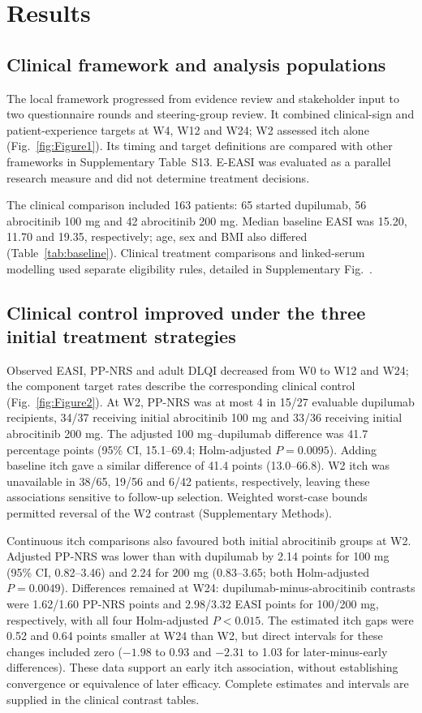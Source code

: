 \section{Results}
\subsection{Clinical framework and analysis populations}
The local framework progressed from evidence review and stakeholder input to two questionnaire rounds and steering-group review. It combined clinical-sign and patient-experience targets at W4, W12 and W24; W2 assessed itch alone (Fig.~\ref{fig:Figure1}). Its timing and target definitions are compared with other frameworks in Supplementary Table~S13. E-EASI was evaluated as a parallel research measure and did not determine treatment decisions.


The clinical comparison included 163 patients: 65 started dupilumab, 56 abrocitinib 100 mg and 42 abrocitinib 200 mg. Median baseline EASI was 15.20, 11.70 and 19.35, respectively; age, sex and BMI also differed (Table~\ref{tab:baseline}). Clinical treatment comparisons and linked-serum modelling used separate eligibility rules, detailed in Supplementary Fig.~.


\subsection{Clinical control improved under the three initial treatment strategies}
Observed EASI, PP-NRS and adult DLQI decreased from W0 to W12 and W24; the component target rates describe the corresponding clinical control (Fig.~\ref{fig:Figure2}). At W2, PP-NRS was at most 4 in 15/27 evaluable dupilumab recipients, 34/37 receiving initial abrocitinib 100 mg and 33/36 receiving initial abrocitinib 200 mg. The adjusted 100 mg--dupilumab difference was 41.7 percentage points (95\% CI, 15.1--69.4; Holm-adjusted $P=0.0095$). Adding baseline itch gave a similar difference of 41.4 points (13.0--66.8). W2 itch was unavailable in 38/65, 19/56 and 6/42 patients, respectively, leaving these associations sensitive to follow-up selection. Weighted worst-case bounds permitted reversal of the W2 contrast (Supplementary Methods).

Continuous itch comparisons also favoured both initial abrocitinib groups at W2. Adjusted PP-NRS was lower than with dupilumab by 2.14 points for 100 mg (95\% CI, 0.82--3.46) and 2.24 for 200 mg (0.83--3.65; both Holm-adjusted $P=0.0049$). Differences remained at W24: dupilumab-minus-abrocitinib contrasts were 1.62/1.60 PP-NRS points and 2.98/3.32 EASI points for 100/200 mg, respectively, with all four Holm-adjusted $P<0.015$. The estimated itch gaps were 0.52 and 0.64 points smaller at W24 than W2, but direct intervals for these changes included zero ($-1.98$ to 0.93 and $-2.31$ to 1.03 for later-minus-early differences). These data support an early itch association, without establishing convergence or equivalence of later efficacy. Complete estimates and intervals are supplied in the clinical contrast tables.

